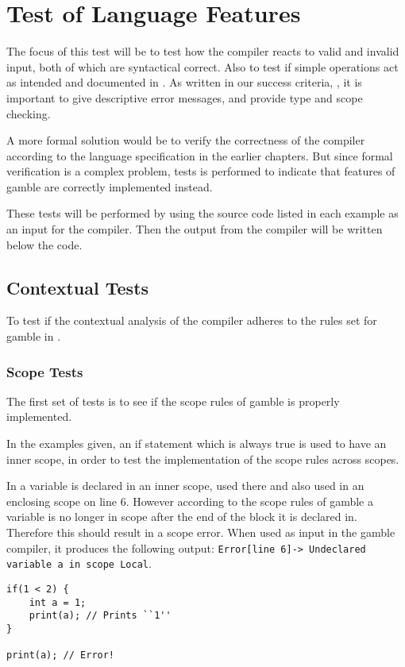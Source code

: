 \section{Test of Language Features}
\label{cha:test_of_language_features}
The focus of this test will be to test how the compiler reacts to valid and invalid input, both of which are syntactical correct.
Also to test if simple operations act as intended and documented in .
As written in our success criteria, , it is important to give descriptive error messages, and provide type and scope checking.

A more formal solution would be to verify the correctness of the compiler according to the language specification in the earlier chapters.
But since formal verification is a complex problem, tests is performed to indicate that features of \gls{gamble} are correctly implemented instead. \citep{Verification}

These tests will be performed by using the source code listed in each example as an input for the compiler.
Then the output from the compiler will be written below the code.

\subsection*{Contextual Tests}
To test if the contextual analysis of the compiler adheres to the rules set for \gls{gamble} in .

\subsubsection*{Scope Tests}
The first set of tests is to see if the scope rules of \gls{gamble} is properly implemented.

In the examples given, an if statement which is always true is used to have an inner scope, in order to test the implementation of the scope rules across scopes.

In  a variable is declared in an inner scope, used there and also used in an enclosing scope on line 6.
However according to the scope rules of \gls{gamble} a variable is no longer in scope after the end of the block it is declared in.
Therefore this should result in a scope error.
When used as input in the \gls{gamble} compiler, it produces the following output: \texttt{Error[line    6]-> Undeclared variable a in scope Local}.

\begin{lstlisting}[caption={Example of a scope error in \gls{gamble}},label={lst:scope1},frame=tb]
if(1 < 2) {
    int a = 1;
    print(a); // Prints ``1''
}

print(a); // Error!
\end{lstlisting}

